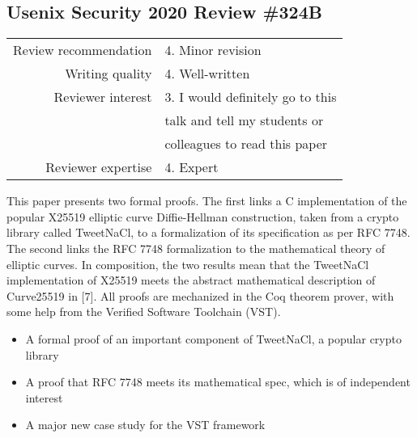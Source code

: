 \newpage
\subsection{Usenix Security 2020 Review \#324B}

\begin{tabular}{rl}
    \toprule
    Review recommendation & 4. Minor revision                \\
    Writing quality       & 4. Well-written                  \\
    Reviewer interest     & 3. I would definitely go to this \\
                          & talk and tell my students or     \\
                          & colleagues to read this paper    \\
    Reviewer expertise    & 4. Expert                        \\
    \bottomrule
\end{tabular}

\begin{center}
\end{center}
This paper presents two formal proofs. The first links a C implementation of the popular X25519 elliptic curve Diffie-Hellman construction, taken from a crypto library called TweetNaCl, to a formalization of its specification as per RFC 7748. The second links the RFC 7748 formalization to the mathematical theory of elliptic curves. In composition, the two results mean that the TweetNaCl implementation of X25519 meets the abstract mathematical description of Curve25519 in [7]. All proofs are mechanized in the Coq theorem prover, with some help from the Verified Software Toolchain (VST).

\begin{center}
\end{center}

\begin{itemize}
    \item A formal proof of an important component of TweetNaCl, a popular crypto library
    \item A proof that RFC 7748 meets its mathematical spec, which is of independent interest
    \item A major new case study for the VST framework
\end{itemize}

\begin{center}
\end{center}

